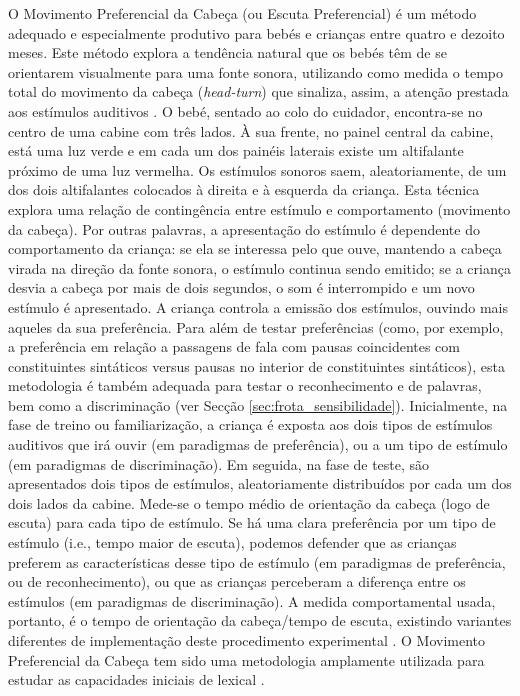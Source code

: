 \documentclass[output=paper]{LSP/langsci}
\begin{document}
O Movimento Preferencial da Cabeça (ou Escuta Preferencial) é um método adequado e especialmente produtivo para bebés e crianças entre quatro e dezoito meses. Este método explora a tendência natural que os bebés têm de se orientarem visualmente para uma fonte sonora, utilizando como medida o tempo total do movimento da cabeça (\textit{head-turn}) que sinaliza, assim, a atenção prestada aos estímulos auditivos \citep{kemlernelson_etal1995}. O bebé, sentado ao colo do cuidador, encontra-se no centro de uma cabine com três lados. À sua frente, no painel central da cabine, está uma luz verde e em cada um dos painéis laterais existe um altifalante próximo de uma luz vermelha. Os estímulos sonoros saem, aleatoriamente, de um dos dois altifalantes colocados à direita e à esquerda da criança. Esta técnica explora uma relação de contingência entre estímulo e comportamento (movimento da cabeça). Por outras palavras, a apresentação do estímulo é dependente do comportamento da criança: se ela se interessa pelo que ouve, mantendo a cabeça virada na direção da fonte sonora, o estímulo continua sendo emitido; se a criança desvia a cabeça por mais de dois segundos, o som é interrompido e um novo estímulo é apresentado. A criança controla a emissão dos estímulos, ouvindo mais aqueles da sua preferência. Para além de testar preferências (como, por exemplo, a preferência em relação a passagens de fala com pausas coincidentes com constituintes sintáticos versus pausas no interior de constituintes sintáticos), esta metodologia é também adequada para testar o reconhecimento e  de palavras, bem como a discriminação (ver Secção \ref{sec:frota_sensibilidade}). Inicialmente, na fase de treino ou familiarização, a criança é exposta aos dois tipos de estímulos auditivos que irá ouvir (em paradigmas de preferência), ou a um tipo de estímulo (em paradigmas de discriminação). Em seguida, na fase de teste, são apresentados dois tipos de estímulos, aleatoriamente distribuídos por cada um dos dois lados da cabine. Mede-se o tempo médio de orientação da cabeça (logo de escuta) para cada tipo de estímulo. Se há uma clara preferência por um tipo de estímulo (i.e., tempo maior de escuta), podemos defender que as crianças preferem as características desse tipo de estímulo (em paradigmas de preferência, ou de reconhecimento), ou que as crianças perceberam a diferença entre os estímulos (em paradigmas de discriminação). A medida comportamental usada, portanto, é o tempo de orientação da cabeça/tempo de escuta, existindo variantes diferentes de implementação deste procedimento experimental \citep{jusczyk1997}. O Movimento Preferencial da Cabeça tem sido uma metodologia amplamente utilizada para estudar as capacidades iniciais de  lexical \citep{gerkenaslin2005}.
\end{document}
